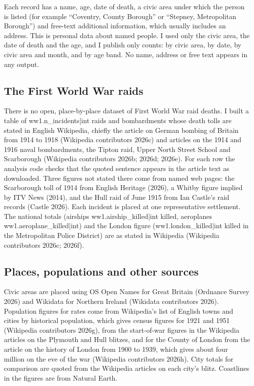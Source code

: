 \documentclass[11pt,a4paper]{article}
\begin{document}
Each record has a name, age, date of death, a civic area under which the person is listed (for example ``Coventry, County Borough'' or ``Stepney, Metropolitan Borough'') and free-text additional information, which usually includes an address. This is personal data about named people. I used only the civic area, the date of death and the age, and I publish only counts: by civic area, by date, by civic area and month, and by age band. No name, address or free text appears in any output.

\subsection{The First World War raids}

There is no open, place-by-place dataset of First World War raid deaths. I built a table of {{ww1.n_incidents|int}} raids and bombardments whose death tolls are stated in English Wikipedia, chiefly the article on German bombing of Britain from 1914 to 1918 (Wikipedia contributors 2026c) and articles on the 1914 and 1916 naval bombardments, the Tipton raid, Upper North Street School and Scarborough (Wikipedia contributors 2026b; 2026d; 2026e). For each row the analysis code checks that the quoted sentence appears in the article text as downloaded. Three figures not stated there come from named web pages: the Scarborough toll of 1914 from English Heritage (2026), a Whitby figure implied by ITV News (2014), and the Hull raid of June 1915 from Ian Castle's raid records (Castle 2026). Each incident is placed at one representative settlement. The national totals (airships {{ww1.airship_killed|int}} killed, aeroplanes {{ww1.aeroplane_killed|int}}) and the London figure ({{ww1.london_killed|int}} killed in the Metropolitan Police District) are as stated in Wikipedia (Wikipedia contributors 2026c; 2026f).

\subsection{Places, populations and other sources}

Civic areas are placed using OS Open Names for Great Britain (Ordnance Survey 2026) and Wikidata for Northern Ireland (Wikidata contributors 2026). Population figures for rates come from Wikipedia's list of English towns and cities by historical population, which gives census figures for 1921 and 1951 (Wikipedia contributors 2026g), from the start-of-war figures in the Wikipedia articles on the Plymouth and Hull blitzes, and for the County of London from the article on the history of London from 1900 to 1939, which gives about four million on the eve of the war (Wikipedia contributors 2026h). City totals for comparison are quoted from the Wikipedia articles on each city's blitz. Coastlines in the figures are from Natural Earth.
\end{document}
